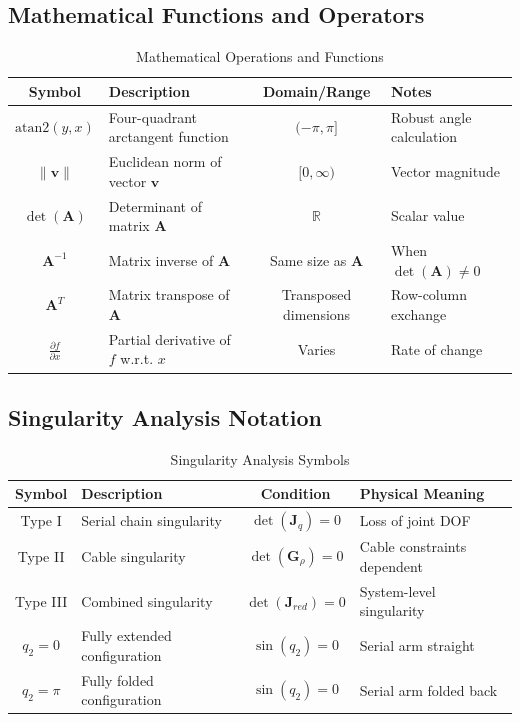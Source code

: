 \subsection{Mathematical Functions and Operators}

\begin{table}[h!]
\centering
\caption{Mathematical Operations and Functions}
\begin{tabular}{|c|l|c|l|}
\hline
\textbf{Symbol} & \textbf{Description} & \textbf{Domain/Range} & \textbf{Notes} \\
\hline
$\text{atan2}(y,x)$ & Four-quadrant arctangent function & $(-\pi, \pi]$ & Robust angle calculation \\
$\|\bm{v}\|$ & Euclidean norm of vector $\bm{v}$ & $[0, \infty)$ & Vector magnitude \\
$\det(\bm{A})$ & Determinant of matrix $\bm{A}$ & $\mathbb{R}$ & Scalar value \\
$\bm{A}^{-1}$ & Matrix inverse of $\bm{A}$ & Same size as $\bm{A}$ & When $\det(\bm{A}) \neq 0$ \\
$\bm{A}^T$ & Matrix transpose of $\bm{A}$ & Transposed dimensions & Row-column exchange \\
$\frac{\partial f}{\partial x}$ & Partial derivative of $f$ w.r.t. $x$ & Varies & Rate of change \\
\hline
\end{tabular}
\end{table}

\subsection{Singularity Analysis Notation}

\begin{table}[h!]
\centering
\caption{Singularity Analysis Symbols}
\begin{tabular}{|c|l|c|l|}
\hline
\textbf{Symbol} & \textbf{Description} & \textbf{Condition} & \textbf{Physical Meaning} \\
\hline
Type I & Serial chain singularity & $\det(\bm{J}_q) = 0$ & Loss of joint DOF \\
Type II & Cable singularity & $\det(\bm{G}_{\rho}) = 0$ & Cable constraints dependent \\
Type III & Combined singularity & $\det(\bm{J}_{red}) = 0$ & System-level singularity \\
$q_2 = 0$ & Fully extended configuration & $\sin(q_2) = 0$ & Serial arm straight \\
$q_2 = \pi$ & Fully folded configuration & $\sin(q_2) = 0$ & Serial arm folded back \\
\hline
\end{tabular}
\end{table}

